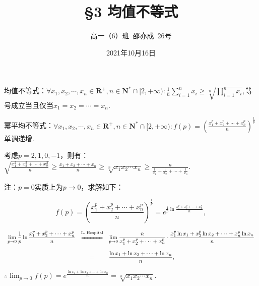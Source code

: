 \documentclass[8pt]{article}
\title{\S 3 均值不等式}
\author{高一（6）班\ 邵亦成\ 26号}
\date{2021年10月16日}
\begin{document}
	\maketitle

	均值不等式：$\displaystyle \forall x_1, x_2, \cdots, x_n \in \mathbf{R}^{+}, n \in \mathbf{N}^{*}\cap[2, +\infty): \frac{1}{n}\sum_{i=1}^{n}{x_i}\geq\sqrt[n]{\prod_{i=1}^{n}{x_i}},$等号成立当且仅当$x_1=x_2=\cdots=x_n$.

	幂平均不等式：$\displaystyle \forall x_1, x_2, \cdots, x_n \in \mathbf{R}^{+}, n \in \mathbf{N}^{*}\cap[2, +\infty): f(p)=\left(\frac{x_1^p+x_2^p+\cdots+x_n^p}{n}\right)^\frac{1}{p}$单调递增.

	考虑$p=2,1,0,-1$，则有：$\displaystyle \sqrt{\frac{x_1^2+x_2^2+\cdots+x_n^2}{n}}\geq \frac{x_1+x_2+\cdots+x_n}{n} \geq \sqrt[n]{x_1x_2\cdots x_n} \geq \frac{n}{\frac{1}{x_1}+\frac{1}{x_2}+\cdots+\frac{1}{x_n}}.$

	注：$p=0$实质上为$p\rightarrow0$，求解如下：

	$$f(p)=\left(\frac{x_1^p+x_2^p+\cdots+x_n^p}{n}\right)^\frac{1}{p}=e^{\frac{1}{p}\ln{\frac{x_1^p+x_2^p+\cdots+x_n^p}{n}}},$$

	$$
	\begin{array}{rcl}
	\displaystyle \lim_{p\rightarrow 0}{\frac{1}{p}\ln{\frac{x_1^p+x_2^p+\cdots+x_n^p}{n}}}&\overset{\text{L. Hospital}}{\xlongequal{\quad\quad\quad}}&\displaystyle \lim_{p\rightarrow 0}{\frac{n}{x_1^p+x_2^p+\cdots+x_n^p}\cdot\frac{x_1^p\ln{x_1}+x_2^p\ln{x_2}+\cdots+x_n^p\ln{x_n}}{n}}\\\\
	&=&\displaystyle\frac{\ln x_1+\ln x_2+\cdots+\ln x_n}{n},\\
	\end{array}
	$$

	$\displaystyle\therefore\lim_{p\rightarrow0}f(p)=e^{\frac{\ln x_1+\ln x_2+\cdots+\ln x_n}{n}}=\sqrt[n]{x_1 x_2 \cdots x_n}.$
\end{document}
